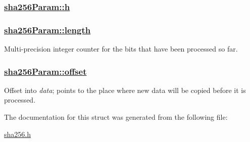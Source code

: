 \hypertarget{structsha256Param_o0}{
\subsubsection[h]{\setlength{\rightskip}{0pt plus 5cm}\hyperlink{structsha256Param_o0}{sha256Param::h}}}
\label{structsha256Param_o0}


\hypertarget{structsha256Param_o2}{
\subsubsection[length]{\setlength{\rightskip}{0pt plus 5cm}\hyperlink{structsha256Param_o2}{sha256Param::length}}}
\label{structsha256Param_o2}


Multi-precision integer counter for the bits that have been processed so far. 

\hypertarget{structsha256Param_o3}{
\subsubsection[offset]{\setlength{\rightskip}{0pt plus 5cm}\hyperlink{structsha256Param_o3}{sha256Param::offset}}}
\label{structsha256Param_o3}


Offset into {\em data\/}; points to the place where new data will be copied before it is processed. 



The documentation for this struct was generated from the following file:\begin{CompactItemize}
\item 
\hyperlink{sha256_8h}{sha256.h}\end{CompactItemize}
